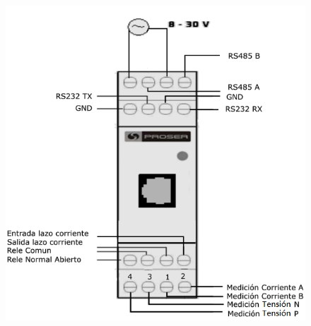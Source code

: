 \begin{figure}[!htb]
	\centering
	\includegraphics[width=\textwidth , keepaspectratio]{Figures/ApendixA/conectores2.png}
	\label{fig:ADEfuncbloc}
\end{figure}

